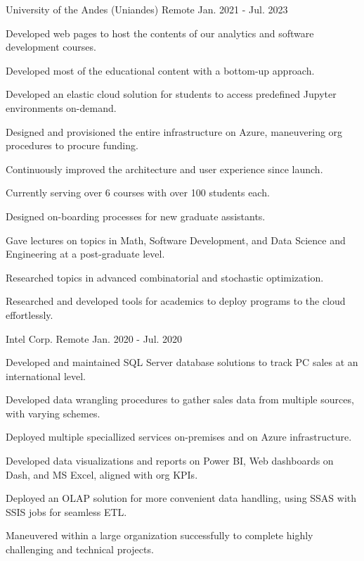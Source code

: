 \begin{cventries}
	{University of the Andes (Uniandes)} %
	{Remote} %
	{Jan. 2021 {-} Jul. 2023} %
	{
		\begin{cvitems} %
			\item {Developed web pages to host the contents of our analytics and software development courses.}
			\item {Developed most of the educational content with a bottom-up approach.}
			\item {Developed an elastic cloud solution for students to access predefined Jupyter environments on-demand.}
			\item {Designed and provisioned the entire infrastructure on Azure, maneuvering org procedures to procure funding.}
			\item {Continuously improved the architecture and user experience since launch.}
			\item {Currently serving over 6 courses with over 100 students each.}
			\item {Designed on-boarding processes for new graduate assistants.}
			\item {Gave lectures on topics in Math, Software Development, and Data Science and Engineering at a post-graduate level.}
			\item {Researched topics in advanced combinatorial and stochastic optimization.}
			\item {Researched and developed tools for academics to deploy programs to the cloud effortlessly.}
		\end{cvitems}
	}

	{Intel Corp.} %
	{Remote} %
	{Jan. 2020 {-} Jul. 2020} %
	{
		\begin{cvitems}
			\item {Developed and maintained SQL Server database solutions to track PC sales at an international level.}
			\item {Developed data wrangling procedures to gather sales data from multiple sources, with varying schemes.}
			\item {Deployed multiple speciallized services on-premises and on Azure infrastructure.}
			\item {Developed data visualizations and reports on Power BI, Web dashboards on Dash, and MS Excel, aligned with org KPIs.}
			\item {Deployed an OLAP solution for more convenient data handling, using SSAS with SSIS jobs for seamless ETL.}
			\item {Maneuvered within a large organization successfully to complete highly challenging and technical projects.}
		\end{cvitems}
	}


\end{cventries}
